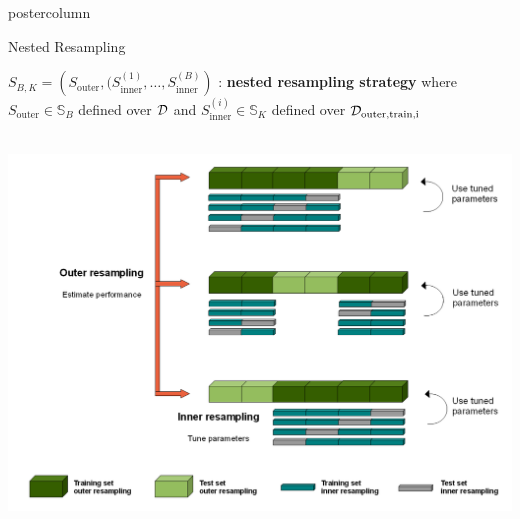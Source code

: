 \documentclass{beamer}
\begin{document}
\begin{frame}[fragile]{}
\begin{columns}
\begin{column}{.31\textwidth}
\begin{beamercolorbox}[center]{postercolumn}
\begin{minipage}{.98\textwidth}
{%
\begin{myblock}{Nested Resampling}

$S_{B, K} = \left(S_{\mathrm{outer}}, (S_{\mathrm{inner}}^{(1)},\dots,S_{\mathrm{inner}}^{(B)}
\right)$ : \textbf{nested resampling strategy} where $S_{\mathrm{outer}} \in \mathds{S}_B$ defined over $\mathcal{D}$ and $S_{\mathrm{inner}}^{(i)} \in \mathds{S}_K$ defined over $\mathcal{D}_{\textrm{outer,train,i}}$\\\

 \begin{center}
             \includegraphics[width=0.9\columnwidth]{img/tuning_2.PNG}
               \end{center}

\end{myblock}

			  }
			\end{minipage}
		\end{beamercolorbox}
	\end{column}
\end{columns}

\end{frame}
\end{document}
